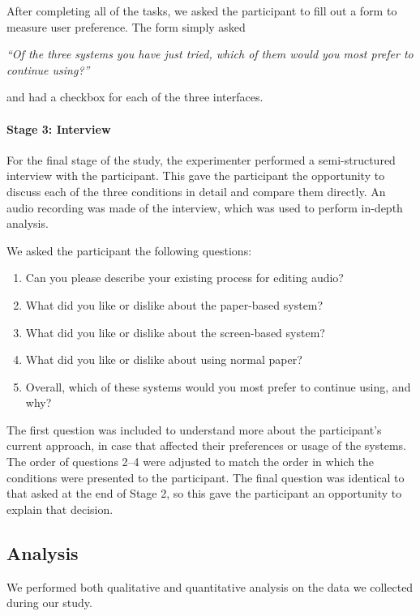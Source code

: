 After completing all of the tasks, we asked the participant to fill out a form to measure user preference. The form
simply asked

\textit{``Of the three systems you have just tried, which of them would you most prefer to continue
using?''}

and had a checkbox for each of the three interfaces.


\paragraph{Stage 3: Interview}

For the final stage of the study, the experimenter performed a semi-structured interview with the participant. This
gave the participant the opportunity to discuss each of the three conditions in detail and compare them directly. An
audio recording was made of the interview, which was used to perform in-depth analysis.

We asked the participant the following questions:

{\singlespacing
\begin{enumerate}
  \item Can you please describe your existing process for editing audio?
  \item What did you like or dislike about the paper-based system?
  \item What did you like or dislike about the screen-based system?
  \item What did you like or dislike about using normal paper?
  \item Overall, which of these systems would you most prefer to continue using, and why?
\end{enumerate}
}

The first question was included to understand more about the participant's current approach, in case that affected
their preferences or usage of the systems.  The order of questions 2--4 were adjusted to match the order in which the
conditions were presented to the participant.  The final question was identical to that asked at the end of Stage 2, so
this gave the participant an opportunity to explain that decision.

\subsection{Analysis}

We performed both qualitative and quantitative analysis on the data we collected during our study.

